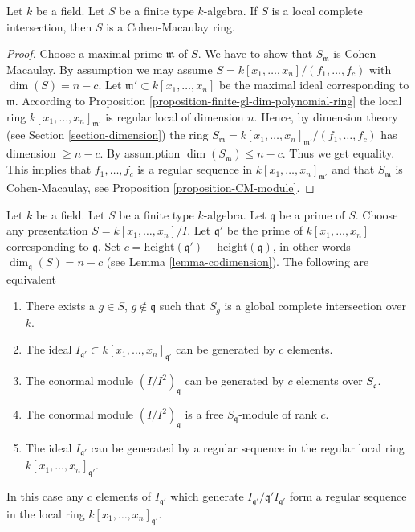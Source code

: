 \begin{lemma}
\label{lemma-lci-CM}
Let $k$ be a field. Let $S$ be a finite type $k$-algebra.
If $S$ is a local complete intersection, then
$S$ is a Cohen-Macaulay ring.
\end{lemma}

\begin{proof}
Choose a maximal prime $\mathfrak m$ of $S$.
We have to show that $S_\mathfrak m$ is Cohen-Macaulay.
By assumption we may assume $S = k[x_1, \ldots, x_n]/(f_1, \ldots, f_c)$
with $\dim(S) = n - c$. Let $\mathfrak m' \subset k[x_1, \ldots, x_n]$
be the maximal ideal corresponding to $\mathfrak m$.
According to Proposition \ref{proposition-finite-gl-dim-polynomial-ring}
the local ring
$k[x_1, \ldots, x_n]_{\mathfrak m'}$ is regular local of
dimension $n$. Hence, by dimension theory
(see Section \ref{section-dimension})
the ring
$S_{\mathfrak m} = k[x_1, \ldots, x_n]_{\mathfrak m'}/(f_1, \ldots, f_c)$
has dimension $\geq n - c$. By assumption $\dim(S_{\mathfrak m}) \leq n - c$.
Thus we get equality. This implies that $f_1, \ldots, f_c$ is a regular
sequence in $k[x_1, \ldots, x_n]_{\mathfrak m'}$ and that
$S_{\mathfrak m}$ is Cohen-Macaulay, see Proposition 
\ref{proposition-CM-module}.
\end{proof}

\begin{lemma}
\label{lemma-lci}
Let $k$ be a field.
Let $S$ be a finite type $k$-algebra.
Let $\mathfrak q$ be a prime of $S$.
Choose any presentation $S = k[x_1, \ldots, x_n]/I$.
Let $\mathfrak q'$ be the prime of $k[x_1, \ldots, x_n]$ corresponding
to $\mathfrak q$. Set
$c = \text{height}(\mathfrak q') - \text{height}(\mathfrak q)$,
in other words $\dim_{\mathfrak q}(S) = n - c$
(see Lemma \ref{lemma-codimension}). The following are equivalent
\begin{enumerate}
\item There exists a $g \in S$, $g \not \in \mathfrak q$
such that $S_g$ is a global complete intersection over $k$.
\item The ideal $I_{\mathfrak q'} \subset k[x_1, \ldots, x_n]_{\mathfrak q'}$
can be generated by $c$ elements.
\item The conormal module $(I/I^2)_{\mathfrak q}$ can be generated by
$c$ elements over $S_{\mathfrak q}$.
\item The conormal module $(I/I^2)_{\mathfrak q}$ is a free
$S_{\mathfrak q}$-module of rank $c$.
\item The ideal $I_{\mathfrak q'}$ can be generated by a regular sequence
in the regular local ring $k[x_1, \ldots, x_n]_{\mathfrak q'}$.
\end{enumerate}
In this case any $c$ elements of $I_{\mathfrak q'}$
which generate $I_{\mathfrak q'}/\mathfrak q'I_{\mathfrak q'}$
form a regular sequence in the local
ring $k[x_1, \ldots, x_n]_{\mathfrak q'}$.
\end{lemma}

